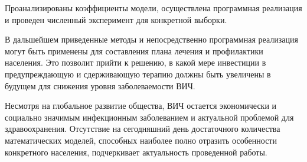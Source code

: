 \documentclass[a4paper]{report}
\begin{document}
	Проанализированы коэффициенты модели, осуществлена программная реализация и проведен численный эксперимент для конкретной выборки.
	
	В дальшейшем приведенные методы и непосредственно программная реализация могут быть применены для составления плана лечения и профилактики населения. Это позволит прийти к решению, в какой мере инвестиции в предупреждающую и сдерживающую терапию должны быть увеличены в будущем для снижения уровня заболеваемости ВИЧ.
	
	Несмотря на глобальное развитие общества, ВИЧ остается экономически и социально значимым инфекционным заболеванием и актуальной проблемой для здравоохранения. Отсутствие на сегодняшний день достаточного количества  математических моделей, способных наиболее полно отразить особенности конкретного населения, подчеркивает актуальность проведенной работы.
	
\end{document}
